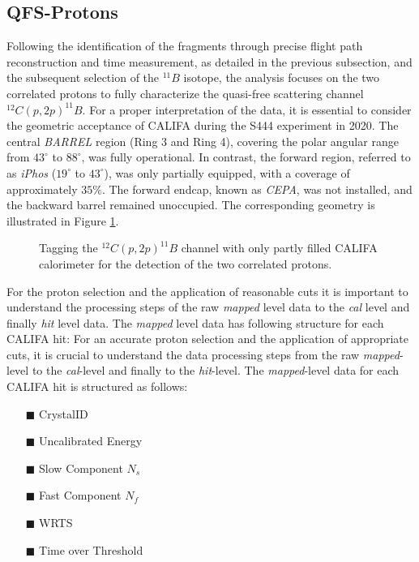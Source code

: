 \subsection{QFS-Protons}
Following the identification of the fragments through precise flight path reconstruction and time measurement, as detailed in the previous subsection, and the subsequent selection of the $^{11}B$ isotope, the analysis focuses on the two correlated protons to fully characterize the quasi-free scattering channel $^{12}C(p,2p)^{11}B$.\newline
For a proper interpretation of the data, it is essential to consider the geometric acceptance of CALIFA during the S444 experiment in 2020. The central \textit{BARREL} region (Ring 3 and Ring 4), covering the polar angular range from $43^{\circ}$ to $88^{\circ}$, was fully operational. In contrast, the forward region, referred to as \textit{iPhos} ($19^{\circ}$ to $43^{\circ}$), was only partially equipped, with a coverage of approximately $35\%$. The forward endcap, known as \textit{CEPA}, was not installed, and the backward barrel remained unoccupied. The corresponding geometry is illustrated in Figure \ref{fig:qfs_reac_and_geo}.\newline
\begin{figure}[htpb]
    \centering
    \qquad
    \caption{Tagging the $^{12}C(p,2p)^{11}B$ channel with only partly filled CALIFA calorimeter for the detection of the two correlated protons.}%
    \label{fig:qfs_reac_and_geo}%
\end{figure}
For the proton selection and the application of reasonable cuts it is important to understand the processing steps of the raw \textit{mapped} level data to the \textit{cal} level and finally \textit{hit} level data. The \textit{mapped} level data has following structure for each CALIFA hit:
For an accurate proton selection and the application of appropriate cuts, it is crucial to understand the data processing steps from the raw \textit{mapped}-level to the \textit{cal}-level and finally to the \textit{hit}-level. The \textit{mapped}-level data for each CALIFA hit is structured as follows:
\begin{itemize}
\item[$\blacksquare$] CrystalID
\item[$\blacksquare$] Uncalibrated Energy
\item[$\blacksquare$] Slow Component $N_s$
\item[$\blacksquare$] Fast Component $N_f$
\item[$\blacksquare$] WRTS
\item[$\blacksquare$] Time over Threshold
\end{itemize}

